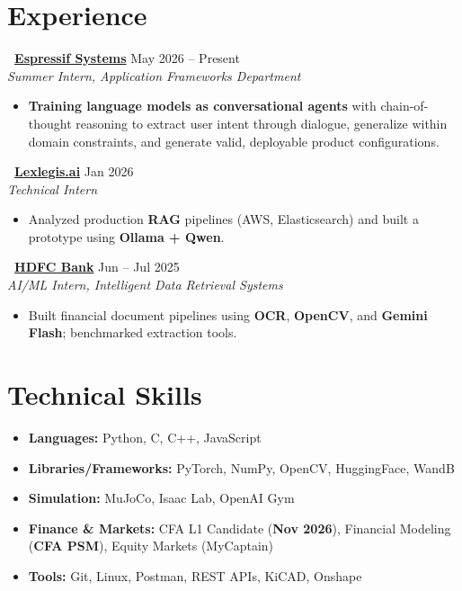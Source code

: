 \documentclass[letterpaper,10.5pt]{article}
\newcommand{\weblink}[2]{\faGlobe\ \href{#1}{#2}}
\begin{document}
\section{Experience}

\noindent\textbf{\weblink{https://www.espressif.com}{Espressif Systems}} \hfill May 2026 -- Present \\
\textit{Summer Intern, Application Frameworks Department}
\begin{itemize}[leftmargin=*,itemsep=0.3pt,topsep=0.8pt,parsep=0pt]
    \item \textbf{Training language models as conversational agents} with chain-of-thought reasoning to extract user intent through dialogue, generalize within domain constraints, and generate valid, deployable product configurations.
\end{itemize}

\noindent\textbf{\weblink{https://www.lexlegis.ai}{Lexlegis.ai}} \hfill Jan 2026 \\
\textit{Technical Intern}
\begin{itemize}[leftmargin=*,itemsep=0.3pt,topsep=0.8pt,parsep=0pt]
    \item Analyzed production \textbf{RAG} pipelines (AWS, Elasticsearch) and built a prototype using \textbf{Ollama + Qwen}.
\end{itemize}

\noindent\textbf{\weblink{https://www.hdfcbank.com}{HDFC Bank}} \hfill Jun -- Jul 2025 \\
\textit{AI/ML Intern, Intelligent Data Retrieval Systems}
\begin{itemize}[leftmargin=*,itemsep=0.3pt,topsep=0.8pt,parsep=0pt]
    \item Built financial document pipelines using \textbf{OCR}, \textbf{OpenCV}, and \textbf{Gemini Flash}; benchmarked extraction tools.
\end{itemize}

\section{Technical Skills}

\begin{itemize}[leftmargin=*,itemsep=0.3pt,topsep=0.8pt,parsep=0pt]
    \item \textbf{Languages:} Python, C, C++, JavaScript
    \item \textbf{Libraries/Frameworks:} PyTorch, NumPy, OpenCV, HuggingFace, WandB
    \item \textbf{Simulation:} MuJoCo, Isaac Lab, OpenAI Gym
    \item \textbf{Finance \& Markets:} CFA L1 Candidate (\textbf{Nov 2026}), Financial Modeling (\textbf{CFA PSM}), Equity Markets (MyCaptain)
    \item \textbf{Tools:} Git, Linux, Postman, REST APIs, KiCAD, Onshape
\end{itemize}
\end{document}
